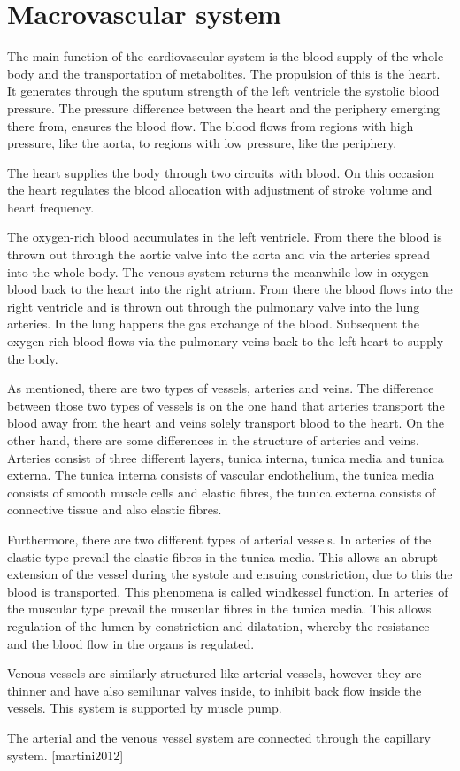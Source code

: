 

\section{Macrovascular system}
The main function of the cardiovascular system is the blood supply of the whole body and the transportation of metabolites. The propulsion of this is the heart. It generates through the sputum strength of the left ventricle the systolic blood pressure. The pressure difference between the heart and the periphery emerging there from, ensures the blood flow. The blood flows from regions with high pressure, like the aorta, to regions with low pressure, like the periphery.

The heart supplies the body through two circuits with blood. On this occasion the heart regulates the blood allocation with adjustment of stroke volume and heart frequency.

The oxygen-rich blood accumulates in the left ventricle. From there the blood is thrown out through the aortic valve into the aorta and via the arteries spread into the whole body. The venous system returns the meanwhile low in oxygen blood back to the heart into the right atrium. From there the blood flows into the right ventricle and is thrown out through the pulmonary valve into the lung arteries. In the lung happens the gas exchange of the blood. Subsequent the oxygen-rich blood flows via the pulmonary veins back to the left heart to supply the body.

As mentioned, there are two types of vessels, arteries and veins. The difference between those two types of vessels is on the one hand that arteries transport the blood away from the heart and veins solely transport blood to the heart. On the other hand, there are some differences in the structure of arteries and veins.
Arteries consist of three different layers, tunica interna, tunica media and tunica externa. The tunica interna consists of vascular endothelium,  the tunica media consists of smooth muscle cells and elastic fibres, the tunica externa consists of connective tissue and also elastic fibres.

Furthermore, there are two different types of arterial vessels. In arteries of the elastic type prevail the elastic fibres in the tunica media. This allows an abrupt extension of the vessel during the systole and ensuing constriction, due to this the blood is transported. This phenomena is called windkessel function. In arteries of the muscular type prevail the muscular fibres in the tunica media. This allows regulation of the lumen by constriction and dilatation, whereby the resistance and the blood flow in the organs is regulated.

Venous vessels are similarly structured like arterial vessels, however they are thinner and have also semilunar valves inside, to inhibit back flow inside the vessels. This system is supported by muscle pump.

The arterial and the venous vessel system are connected through the capillary system. [martini2012]
